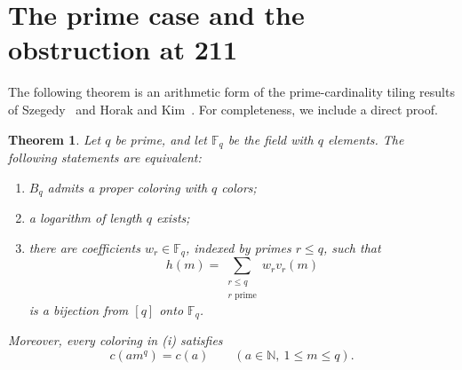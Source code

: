 \documentclass[11pt,reqno]{amsart}
\newcommand{\N}{\mathbb N}
\newcommand{\F}{\mathbb F}
\newtheorem{theorem}{Theorem}[section]
\theoremstyle{definition}
\theoremstyle{remark}
\numberwithin{equation}{section}
\begin{document}
\section{The prime case and the obstruction at 211}\label{sec:prime}
The following theorem is an arithmetic form of the prime-cardinality
tiling results of Szegedy~\cite{Szegedy} and Horak and Kim~\cite{HK}.
For completeness, we include a direct proof.
\begin{theorem}\label{thm:prime}
Let $q$ be prime, and let $\F_q$ be the field with $q$ elements.
The following statements are equivalent:
\begin{enumerate}
\renewcommand{\theenumi}{\roman{enumi}}
\renewcommand{\labelenumi}{\textup{(\theenumi)}}
\item $B_q$ admits a proper coloring with $q$ colors;
\item a logarithm of length $q$ exists;
\item there are coefficients $w_r\in\F_q$, indexed by primes $r\le q$, such that
\begin{equation}\label{eq:linear}
 h(m)=\sum_{\substack{r\le q\\r\text{ prime}}}w_r v_r(m)
\end{equation}
is a bijection from $[q]$ onto $\F_q$.
\end{enumerate}
Moreover, every coloring in \textup{(i)} satisfies
\begin{equation}\label{eq:periodcolor}
 c(am^q)=c(a)\qquad(a\in\N,\ 1\le m\le q).
\end{equation}
\end{theorem}
\end{document}
